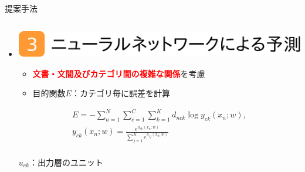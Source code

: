 \documentclass[unicode,10pt]{beamer}
\newlength{\mycolumnwidth}
\newlength{\mytitlefigureheight}
\newcommand{\itemtitle}[1]{\textbf{#1}\\}
\newcommand{\fire}[1]{\textcolor{red}{\textbf{#1}}}
\newcommand{\doublecolumns}[4]{
    \begin{minipage}[t]{#1}
      #2
    \end{minipage}
    \begin{minipage}[t]{#3}
      #4
    \end{minipage}}
\begin{document}
\begin{frame}[t]
\begin{block}{提案手法}
\begin{columns}[onlytextwidth,t]
\begin{column}{\mycolumnwidth}
\begin{itemize}
        \item \itemtitle{\includegraphics[height=\mytitlefigureheight]
                                         {fig/poster_model_title_3.pdf}}
            \begin{itemize}
              \item \fire{文書・文間及びカテゴリ間の複雑な関係}を考慮
              \item 目的関数$E$：カテゴリ毎に誤差を計算
            \end{itemize}
          \doublecolumns{0.6\linewidth}{
            \vspace{-1.5em} %
            \begin{gather*}
              E = - \sum^{N}_{n = 1} \sum^{C}_{c = 1} \sum^{K}_{k = 1}
                    d_{nck} \log{y_{ck}(x_n; w)},
              \label{eq:NNObjective} \\
              y_{ck}(x_n; w) = \frac{e^{u_{ck}(x_n; w)}}
                                    {\sum^{K}_{j = 1} e^{u_{cj}(x_n; w)}}%
              \nonumber \\
            \end{gather*}
          }{0.375\linewidth}{
            \small
            $u_{ck}$：出力層のユニット \\
}
\end{itemize}
\end{column}
\end{columns}
\end{block}
\end{frame}
\end{document}

